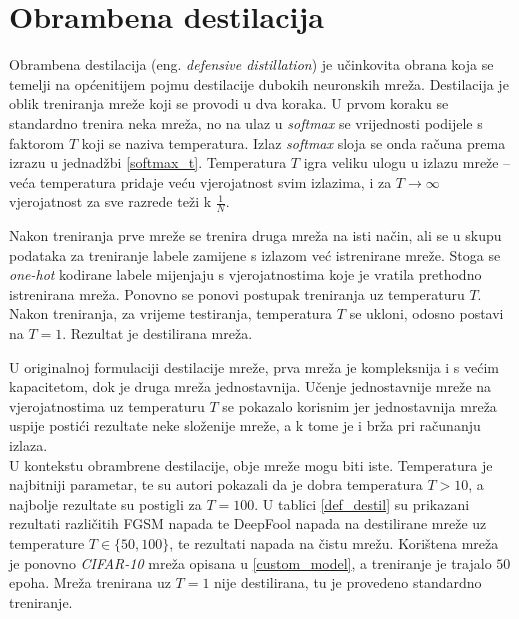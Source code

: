 \documentclass[utf8, diplomski]{fer}
\begin{document}
\section{Obrambena destilacija}
Obrambena destilacija (eng. \textit{defensive distillation}) je učinkovita obrana koja se temelji na općenitijem pojmu destilacije dubokih neuronskih mreža. Destilacija je oblik treniranja mreže koji se provodi u dva koraka. U prvom koraku se standardno trenira neka mreža, no na ulaz u \textit{softmax} se vrijednosti podijele s faktorom $T$ koji se naziva temperatura. Izlaz \textit{softmax} sloja se onda računa prema izrazu u jednadžbi \ref{softmax_t}. Temperatura $T$ igra veliku ulogu u izlazu mreže -- veća temperatura pridaje veću vjerojatnost svim izlazima, i za $T \rightarrow \infty$ vjerojatnost za sve razrede teži k $\frac{1}{N}$. \par
Nakon treniranja prve mreže se trenira druga mreža na isti način, ali se u skupu podataka za treniranje labele zamijene s izlazom već istrenirane mreže. Stoga se \textit{one-hot} kodirane labele mijenjaju s vjerojatnostima koje je vratila prethodno istrenirana mreža. Ponovno se ponovi postupak treniranja uz temperaturu $T$. Nakon treniranja, za vrijeme testiranja, temperatura $T$ se ukloni, odosno postavi na $T = 1$. Rezultat je destilirana mreža. \par
U originalnoj formulaciji destilacije mreže, prva mreža je kompleksnija i s većim kapacitetom, dok je druga mreža jednostavnija. Učenje jednostavnije mreže na vjerojatnostima uz temperaturu $T$ se pokazalo korisnim jer jednostavnija mreža uspije postići rezultate neke složenije mreže, a k tome je i brža pri računanju izlaza. \\
U kontekstu obrambrene destilacije, obje mreže mogu biti iste. Temperatura je najbitniji parametar, te su autori pokazali da je dobra temperatura $T > 10$, a najbolje rezultate su postigli za $T = 100$. U tablici \ref{def_destil} su prikazani rezultati različitih FGSM napada te DeepFool napada na destilirane mreže uz temperature $T \in \{50, 100\}$, te rezultati napada na čistu mrežu. Korištena mreža je ponovno \textit{CIFAR-10} mreža opisana u \ref{custom_model}, a treniranje je trajalo $50$ epoha. Mreža trenirana uz $T = 1$ nije destilirana, tu je provedeno standardno treniranje.
\end{document}
